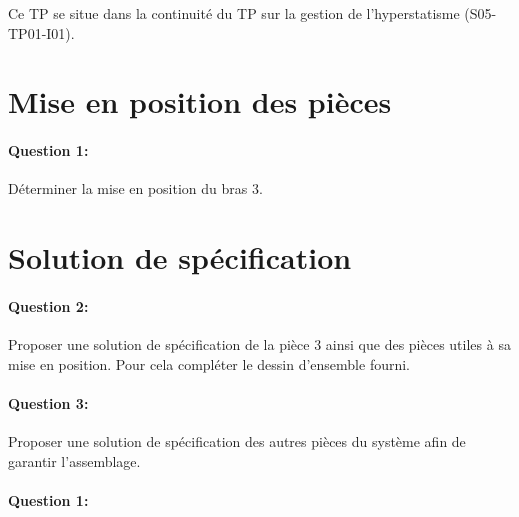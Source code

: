 

\cleardoublepage

Ce TP se situe dans la continuité du TP sur la gestion de l'hyperstatisme (S05-TP01-I01).

\section{Mise en position des pièces}

\paragraph{Question 1:} Déterminer la mise en position du bras 3.

\reponse[4]

\section{Solution de spécification}

\paragraph{Question 2:} Proposer une solution de spécification de la pièce 3 ainsi que des pièces utiles à sa mise en position. Pour cela compléter le dessin d'ensemble fourni.

\paragraph{Question 3:} Proposer une solution de spécification des autres pièces du système afin de garantir l'assemblage.





\pagestyle{correction}\setcounter{section}{0}

\paragraph{Question 1:}
